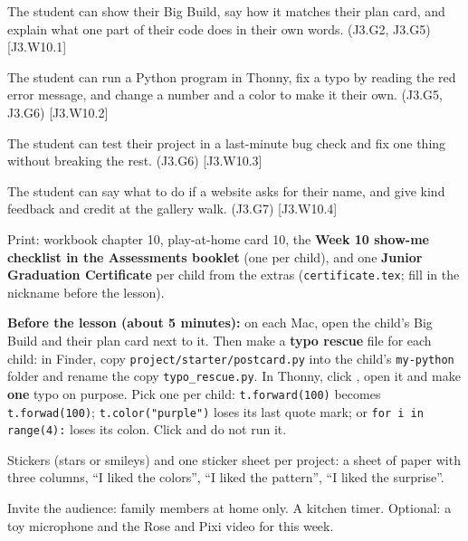 
\begin{objectives}
  \item The student can show their Big Build, say how it matches their plan card, and explain what one part of their code does in their own words. (J3.G2, J3.G5) [J3.W10.1]
  \item The student can run a Python program in Thonny, fix a typo by reading the red error message, and change a number and a color to make it their own. (J3.G5, J3.G6) [J3.W10.2]
  \item The student can test their project in a last-minute bug check and fix one thing without breaking the rest. (J3.G6) [J3.W10.3]
  \item The student can say what to do if a website asks for their name, and give kind feedback and credit at the gallery walk. (J3.G7) [J3.W10.4]
\end{objectives}

\begin{materials}
  \item Print: workbook chapter 10, play-at-home card 10, the \textbf{Week 10 show-me checklist in the Assessments booklet} (one per child), and one \textbf{Junior Graduation Certificate} per child from the extras (\texttt{certificate.tex}; fill in the nickname before the lesson).
  \item \textbf{Before the lesson (about 5 minutes):} on each Mac, open the child's Big Build and their plan card next to it. Then make a \textbf{typo rescue} file for each child: in Finder, copy \texttt{project/starter/postcard.py} into the child's \texttt{my-python} folder and rename the copy \texttt{typo\_rescue.py}. In Thonny, click , open it and make \textbf{one} typo on purpose. Pick one per child: \texttt{t.forward(100)} becomes \texttt{t.forwad(100)}; \texttt{t.color("purple")} loses its last quote mark; or \texttt{for i in range(4):} loses its colon. Click  and do not run it.
  \item Stickers (stars or smileys) and one sticker sheet per project: a sheet of paper with three columns, \enquote{I liked the colors}, \enquote{I liked the pattern}, \enquote{I liked the surprise}.
  \item Invite the audience: family members at home only. A kitchen timer. Optional: a toy microphone and the Rose and Pixi video for this week.
\end{materials}

